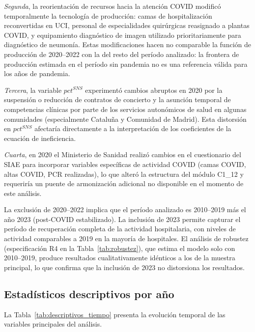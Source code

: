 \textit{Segunda}, la reorientación de recursos hacia la atención COVID modificó temporalmente la tecnología de producción: camas de hospitalización reconvertidas en UCI, personal de especialidades quirúrgicas reasignado a plantas COVID, y equipamiento diagnóstico de imagen utilizado prioritariamente para diagnóstico de neumonía. Estas modificaciones hacen no comparable la función de producción de 2020--2022 con la del resto del período analizado: la frontera de producción estimada en el período sin pandemia no es una referencia válida para los años de pandemia.

\textit{Tercera}, la variable $pct^{SNS}$ experimentó cambios abruptos en 2020 por la suspensión o reducción de contratos de concierto y la asunción temporal de competencias clínicas por parte de los servicios autonómicos de salud en algunas comunidades (especialmente Cataluña y Comunidad de Madrid). Esta distorsión en $pct^{SNS}$ afectaría directamente a la interpretación de los coeficientes de la ecuación de ineficiencia.

\textit{Cuarta}, en 2020 el Ministerio de Sanidad realizó cambios en el cuestionario del SIAE para incorporar variables específicas de actividad COVID (camas COVID, altas COVID, PCR realizadas), lo que alteró la estructura del módulo C1\_12 y requeriría un puente de armonización adicional no disponible en el momento de este análisis.

La exclusión de 2020--2022 implica que el período analizado es 2010--2019 más el año 2023 (post-COVID estabilizado). La inclusión de 2023 permite capturar el período de recuperación completa de la actividad hospitalaria, con niveles de actividad comparables a 2019 en la mayoría de hospitales. El análisis de robustez (especificación R4 en la Tabla~\ref{tab:robustez}), que estima el modelo solo con 2010--2019, produce resultados cualitativamente idénticos a los de la muestra principal, lo que confirma que la inclusión de 2023 no distorsiona los resultados.

\subsection{Estadísticos descriptivos por año}

La Tabla~\ref{tab:descriptivos_tiempo} presenta la evolución temporal de las variables principales del análisis.

